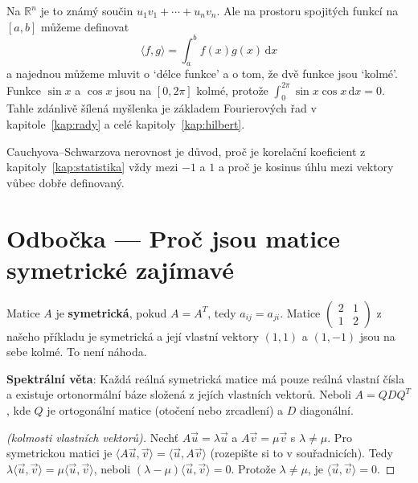 Na $\mathbb{R}^n$ je to známý součin $u_1v_1 + \cdots + u_nv_n$. Ale na prostoru spojitých funkcí na $[a, b]$ můžeme definovat
\begin{equation*}
  \langle f, g\rangle = \int_a^b f(x)g(x)\,\mathrm{d}x
\end{equation*}
a najednou můžeme mluvit o `délce funkce' a o tom, že dvě funkce jsou `kolmé'. Funkce $\sin x$ a $\cos x$ jsou na $[0, 2\pi]$ kolmé, protože $\int_0^{2\pi}\sin x\cos x\,\mathrm{d}x = 0$. Tahle zdánlivě šílená myšlenka je základem Fourierových řad v kapitole~\ref{kap:rady} a celé kapitoly~\ref{kap:hilbert}.

Cauchyova--Schwarzova nerovnost je důvod, proč je korelační koeficient z kapitoly~\ref{kap:statistika} vždy mezi $-1$ a $1$ a proč je kosinus úhlu mezi vektory vůbec dobře definovaný.

\section{Odbočka --- Proč jsou matice symetrické zajímavé}

Matice $A$ je \textbf{symetrická}, pokud $A = A^T$, tedy $a_{ij} = a_{ji}$. Matice $\begin{pmatrix} 2 & 1\\ 1 & 2\end{pmatrix}$ z našeho příkladu je symetrická a její vlastní vektory $(1, 1)$ a $(1, -1)$ jsou na sebe kolmé. To není náhoda.

\begin{definitionbox}
  \textbf{Spektrální věta}: Každá reálná symetrická matice má pouze reálná vlastní čísla a existuje ortonormální báze složená z jejích vlastních vektorů. Neboli $A = QDQ^T$, kde $Q$ je ortogonální matice (otočení nebo zrcadlení) a $D$ diagonální.
\end{definitionbox}

\begin{proof}[(kolmosti vlastních vektorů)]
  Nechť $A\vec{u} = \lambda\vec{u}$ a $A\vec{v} = \mu\vec{v}$ s $\lambda\neq\mu$. Pro symetrickou matici je $\langle A\vec{u}, \vec{v}\rangle = \langle\vec{u}, A\vec{v}\rangle$ (rozepište si to v souřadnicích). Tedy $\lambda\langle\vec{u}, \vec{v}\rangle = \mu\langle\vec{u}, \vec{v}\rangle$, neboli $(\lambda - \mu)\langle\vec{u}, \vec{v}\rangle = 0$. Protože $\lambda\neq\mu$, je $\langle\vec{u}, \vec{v}\rangle = 0$.
\end{proof}

